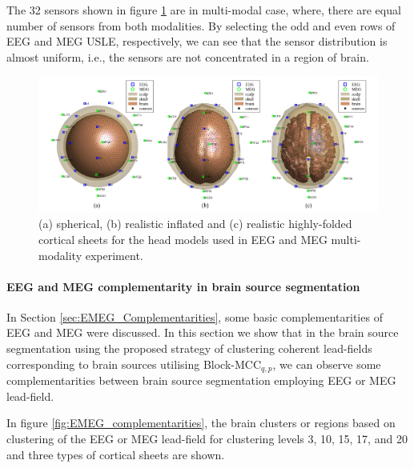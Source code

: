 The 32 sensors shown in figure \ref{fig:Sensor_vol_Source_EMEG} are in multi-modal case, where, there are equal number of sensors from both modalities.
By selecting the odd and even rows of EEG and MEG USLE, respectively, we can see that the sensor distribution is almost uniform, i.e., the sensors are not concentrated in a region of brain.
\begin{figure}[!b]
\centering
\includegraphics[width=1\textwidth,keepaspectratio]{images/Sensor_vol_Source_EMEG.png} %
\centering
\caption{(a) spherical, (b) realistic inflated and (c) realistic highly-folded cortical sheets for the head models used in EEG and MEG multi-modality experiment.}
\label{fig:Sensor_vol_Source_EMEG}
\end{figure}
\paragraph{EEG and MEG complementarity in brain source segmentation}
In Section \ref{sec:EMEG_Complementarities}, some basic complementarities of EEG and MEG were discussed.
In this section we show that in the brain source segmentation using the proposed strategy of clustering coherent lead-fields corresponding to brain sources utilising Block-MCC$_{q,p}$, we can observe some complementarities between brain source segmentation employing EEG or MEG lead-field.

In figure \ref{fig:EMEG_complementarities}, the brain clusters or regions based on clustering of the EEG or MEG lead-field for clustering levels 3, 10, 15, 17, and 20 and three types of cortical sheets are shown.

